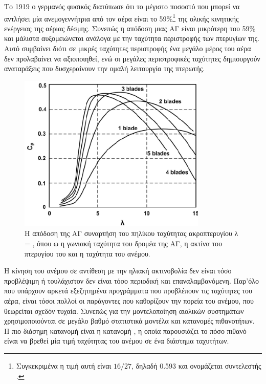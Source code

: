 \documentclass[12pt]{report}
\begin{document}
Το 1919 ο γερμανός φυσικός {} διατύπωσε ότι το μέγιστο ποσοστό που μπορεί να αντλήσει μία ανεμογεννήτρια από τον αέρα είναι το 59\%\footnote{Συγκεκριμένα η τιμή αυτή είναι \(16/27\), δηλαδή 0.593 και 
ονομάζεται συντελεστής {}.} της ολικής κινητικής ενέργειας της αέριας δέσμης. Συνεπώς η απόδοση μιας ΑΓ είναι μικρότερη του 59\% και μάλιστα αυξομειώνεται ανάλογα με την ταχύτητα περιστροφής των πτερυγίων της. 
Αυτό συμβαίνει διότι σε μικρές ταχύτητες περιστροφής ένα μεγάλο μέρος του αέρα δεν προλαβαίνει να αξιοποιηθεί, ενώ οι μεγάλες περιστροφικές ταχύτητες δημιουργούν αναταράξεις που δυσχεραίνουν την ομαλή λειτουργία της πτερωτής.

\begin{figure}[t]
				\center
				\includegraphics[width=0.8\textwidth]{cp}
				\captionsetup{width=0.9\textwidth}
				\caption{Η απόδοση της ΑΓ συναρτήση του πηλίκου ταχύτητας ακροπτερυγίου λ = {}, όπου ω η γωνιακή ταχύτητα του δρομέα της ΑΓ, {} η ακτίνα του πτερυγίου του και 
								{} η ταχύτητα του ανέμου.}
				\label{fig:cp}
\end{figure}

Η κίνηση του ανέμου σε αντίθεση με την ηλιακή ακτινοβολία δεν είναι τόσο προβλέψιμη ή τουλάχιστον δεν είναι τόσο περιοδική και επαναλαμβανόμενη. Παρ'όλο που υπάρχουν αρκετά εξεζητημένα προγράμματα που προβλέπουν τις ταχύτητες 
του αέρα, είναι τόσοι πολλοί οι παράγοντες που καθορίζουν την πορεία του ανέμου, που θεωρείται σχεδόν τυχαία. Συνεπώς για την μοντελοποίηση αιολικών συστημάτων χρησιμοποιούνται σε μεγάλο βαθμό στατιστικά μοντέλα και κατανομές
πιθανοτήτων. Η πιο διάσημη κατανομή είναι η κατανομή {}, η οποία παρουσιάζει το πόσο πιθανό είναι να βρεθεί μία τιμή ταχύτητας του ανέμου σε ένα διάστημα ταχυτήτων.
\end{document}

